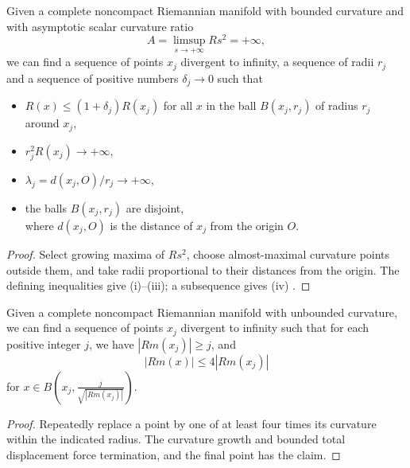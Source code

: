 \begin{lemma} 
  \label{lem:cz-infinite-ascr-point-selection}

 Given a complete noncompact Riemannian manifold with
bounded curvature and with asymptotic scalar curvature ratio
$$
A=\limsup_{s\rightarrow+\infty}Rs^2=+\infty,
$$
we can find a sequence of points $x_j$ divergent to infinity, a
sequence of radii $r_j$ and a sequence of positive numbers
$\delta_j\rightarrow0$ such that
\begin{itemize}
\item[(i)] $R(x)\leq(1+\delta_j)R(x_j)$ for all $x$ in the ball
$B(x_j,r_j)$ of radius $r_j$ around $x_j$, \item[(ii)]
$r^2_jR(x_j)\rightarrow+\infty$, \item[(iii)]
$\lambda_j=d(x_j,O)/r_j\rightarrow+\infty$, \item[(iv)]
the balls $B(x_j,r_j)$ are disjoint, \\
where $d(x_j,O)$ is the distance of $x_j$ from the origin $O$.
\end{itemize}
\end{lemma}
\begin{proof}
\sketch Select growing maxima of $Rs^2$, choose almost-maximal
curvature points outside them, and take radii proportional to their
distances from the origin.  The defining inequalities give (i)--(iii);
a subsequence gives (iv) \cite{Ha95F}.
\end{proof}
\begin{lemma}
  \label{lem:cz-unbounded-curvature-point-selection}

Given a complete noncompact Riemannian manifold with unbounded
curvature, we can find a sequence of points $x_j$ divergent to
infinity such that for each positive integer $j$, we have
$|Rm(x_{j})|\geq j$, and
$$
|Rm(x)|\leq4|Rm(x_{j})|
$$
for $x\in B(x_j,\frac{j}{\sqrt{|Rm(x_{j})|}})$.
\end{lemma}
\begin{proof}
\sketch Repeatedly replace a point by one of at least four times its
curvature within the indicated radius.  The curvature growth and bounded
total displacement force termination, and the final point has the claim.
\end{proof}
